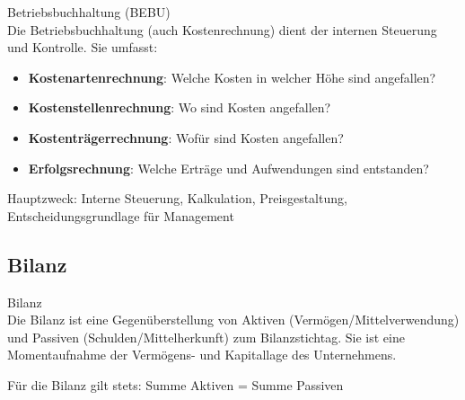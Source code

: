 \begin{concept}{Betriebsbuchhaltung (BEBU)}\\
Die Betriebsbuchhaltung (auch Kostenrechnung) dient der internen Steuerung und Kontrolle. Sie umfasst:
\begin{itemize}
    \item \textbf{Kostenartenrechnung}: Welche Kosten in welcher Höhe sind angefallen?
    \item \textbf{Kostenstellenrechnung}: Wo sind Kosten angefallen?
    \item \textbf{Kostenträgerrechnung}: Wofür sind Kosten angefallen?
    \item \textbf{Erfolgsrechnung}: Welche Erträge und Aufwendungen sind entstanden?
\end{itemize}
Hauptzweck: Interne Steuerung, Kalkulation, Preisgestaltung, Entscheidungsgrundlage für Management
\end{concept}

\subsection{Bilanz}

\begin{definition}{Bilanz}\\
Die Bilanz ist eine Gegenüberstellung von Aktiven (Vermögen/Mittelverwendung) und Passiven (Schulden/Mittelherkunft) zum Bilanzstichtag. Sie ist eine Momentaufnahme der Vermögens- und Kapitallage des Unternehmens.

Für die Bilanz gilt stets: Summe Aktiven = Summe Passiven
\end{definition}

